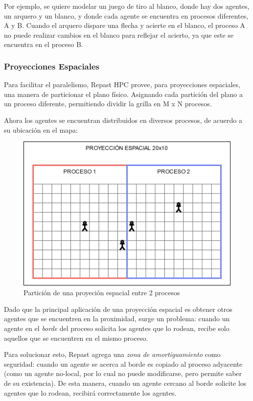 Por ejemplo, se quiere modelar un juego de tiro al blanco, donde hay dos
agentes, un arquero y un blanco, y donde cada agente se encuentra en
procesos diferentes, A y B. Cuando el arquero dispare una flecha y
acierte en el blanco, el proceso A no puede realizar cambios en el
blanco para reflejar el acierto, ya que este se encuentra en el proceso
B.

\subsubsection{Proyecciones Espaciales}

Para facilitar el paralelismo, Repast HPC provee, para proyecciones
espaciales, una manera de particionar el plano físico. Asignando cada
partición del plano a un proceso diferente, permitiendo dividir la
grilla en M x N procesos.

Ahora los agentes se encuentran distribuidos en diversos procesos, de
acuerdo a su ubicación en el mapa:

\begin{figure}
	\centering
	\includegraphics{process_01.png}
	\caption{Partición de una proyeción espacial entre 2 procesos}
\end{figure}

Dado que la principal aplicación de una proyección espacial es obtener
otros agentes que se encuentren en la proximidad, surge un problema:
cuando un agente en el \emph{borde} del proceso solicita los agentes que
lo rodean, recibe solo aquellos que se encuentren en el mismo proceso.

Para solucionar esto, Repast agrega una \emph{zona de amortiguamiento}
como seguridad: cuando un agente se acerca al borde es copiado al
proceso adyacente (como un agente no-local, por lo cual no puede
modificarse, pero permite saber de su existencia). De esta manera,
cuando un agente cercano al borde solicite los agentes que lo rodean,
recibirá correctamente los agentes.

